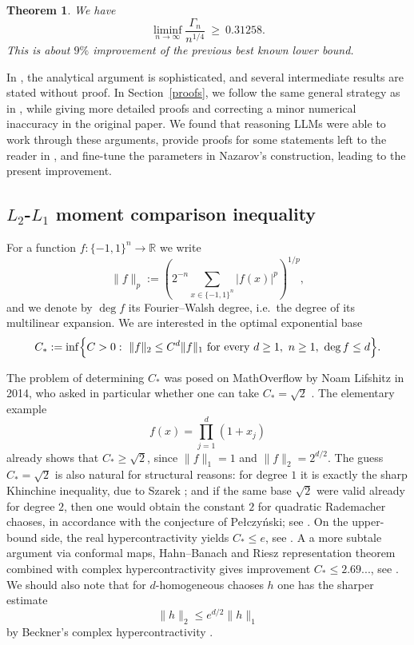 \documentclass[11pt]{article}
\newtheorem{theorem}{Theorem}
\begin{document}
\begin{theorem} \label{Gaussian} We have
    \[
\liminf_{n\to\infty}\frac{\Gamma_n}{n^{1/4}} \ \ge\ 0.31258.
\]
This is about $9\%$ improvement of the previous best known lower bound.  
\end{theorem}

In \cite{Nazarov2003}, the analytical argument is sophisticated, and several intermediate results are stated without proof. In Section~\ref{proofs}, we follow the same general strategy as in \cite{Nazarov2003}, while giving more detailed proofs and correcting a minor numerical inaccuracy in the original paper. We found that reasoning LLMs were able to work through these arguments, provide proofs for some statements left to the reader in \cite{Nazarov2003}, and fine-tune the parameters in Nazarov’s construction, leading to the present improvement.

\subsection{ $L_2$-$L_1$ moment comparison inequality}
For a function \(f:\{-1,1\}^n\to\mathbb{R}\) we write
\[
\|f\|_p:=\left(2^{-n}\sum_{x\in\{-1,1\}^n}|f(x)|^p\right)^{1/p},
\]
and we denote by \(\deg f\) its Fourier--Walsh degree, i.e.\ the degree of its multilinear expansion. We are interested in the optimal exponential base
\[
C_\ast:=\inf\Bigl\{C>0:\ \|f\|_2\le C^d\|f\|_1
\ \text{for every } d\ge 1,\ n\ge 1,\ \deg f\le d\Bigr\}.
\]

The problem of determining \(C_\ast\) was posed on MathOverflow by Noam Lifshitz in 2014, who asked in particular whether one can take \(C_\ast=\sqrt2\) \cite{MO184286}. The elementary example
\[
f(x)=\prod_{j=1}^d (1+x_j)
\]
already shows that \(C_\ast\ge \sqrt2\), since \(\|f\|_1=1\) and \(\|f\|_2=2^{d/2}\). The guess \(C_\ast=\sqrt2\) is also natural for structural reasons: for degree \(1\) it is exactly the sharp Khinchine inequality, due to Szarek \cite{Szarek76}; and if the same base \(\sqrt2\) were valid already for degree \(2\), then one would obtain the constant \(2\) for quadratic Rademacher chaoses, in accordance with the conjecture of Pe\l czy\'nski; see \cite[Remark~6]{IvanisviliTkocz}. On the upper-bound side, the real hypercontractivity yields \(C_\ast\le e\), see \cite[Theorem~9.22]{ODonnell}. A a more subtale argument via conformal maps, Hahn--Banach and Riesz representation theorem combined with complex hypercontractivity gives improvement $C_{*}\leq 2.69...$, see \cite{EskenazisIvanisvili}. We should also note that for \(d\)-homogeneous chaoses $h$ one has the sharper estimate
\[
\|h\|_2\le e^{d/2}\|h\|_1
\]
by Beckner's complex hypercontractivity \cite[Theorem~2]{IvanisviliTkocz}.
\end{document}
